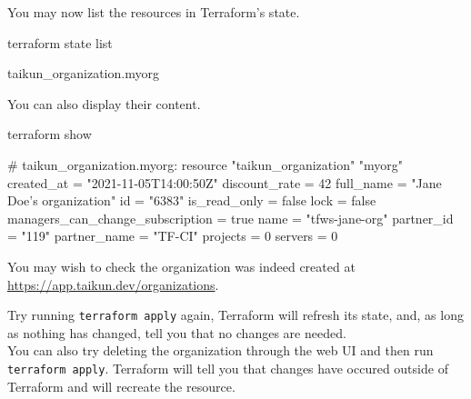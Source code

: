 You may now list the resources in Terraform's state.
\begin{shell}
terraform state list
\end{shell}
\begin{raw}
taikun_organization.myorg
\end{raw}
You can also display their content.
\begin{shell}
terraform show
\end{shell}
\begin{raw}
# taikun_organization.myorg:
resource "taikun_organization" "myorg" {
    created_at                       = "2021-11-05T14:00:50Z"
    discount_rate                    = 42
    full_name                        = "Jane Doe's organization"
    id                               = "6383"
    is_read_only                     = false
    lock                             = false
    managers_can_change_subscription = true
    name                             = "tfws-jane-org"
    partner_id                       = "119"
    partner_name                     = "TF-CI"
    projects                         = 0
    servers                          = 0
}
\end{raw}
You may wish to check the organization was indeed created at \url{https://app.taikun.dev/organizations}.
\begin{tip}
Try running \texttt{terraform apply} again, Terraform will refresh its state, and, as long as
nothing has changed, tell you that no changes are needed.\\

You can also try deleting the organization through the web UI and then run \texttt{terraform apply}.
Terraform will tell you that changes have occured outside of Terraform and will recreate the resource.
\end{tip}
